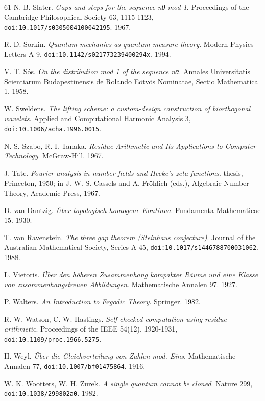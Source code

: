 \begin{thebibliography}{61}
N. B. Slater. \emph{Gaps and steps for the sequence nθ mod 1}. Proceedings of the Cambridge Philosophical Society 63, 1115-1123, \texttt{doi:10.1017/\allowbreak{}s0305004100042195}. 1967.

R. D. Sorkin. \emph{Quantum mechanics as quantum measure theory}. Modern Physics Letters A 9, \texttt{doi:10.1142/\allowbreak{}s021773239400294x}. 1994.

V. T. Sós. \emph{On the distribution mod 1 of the sequence nα}. Annales Universitatis Scientiarum Budapestinensis de Rolando Eötvös Nominatae, Sectio Mathematica 1. 1958.

W. Sweldens. \emph{The lifting scheme: a custom-design construction of biorthogonal wavelets}. Applied and Computational Harmonic Analysis 3, \texttt{doi:10.1006/\allowbreak{}acha.1996.0015}.

N. S. Szabo, R. I. Tanaka. \emph{Residue Arithmetic and Its Applications to Computer Technology}. McGraw-Hill. 1967.

J. Tate. \emph{Fourier analysis in number fields and Hecke's zeta-functions}. thesis, Princeton, 1950; in J. W. S. Cassels and A. Fröhlich (eds.), Algebraic Number Theory, Academic Press, 1967.

D. van Dantzig. \emph{Über topologisch homogene Kontinua}. Fundamenta Mathematicae 15. 1930.

T. van Ravenstein. \emph{The three gap theorem (Steinhaus conjecture)}. Journal of the Australian Mathematical Society, Series A 45, \texttt{doi:10.1017/\allowbreak{}s1446788700031062}. 1988.

L. Vietoris. \emph{Über den höheren Zusammenhang kompakter Räume und eine Klasse von zusammenhangstreuen Abbildungen}. Mathematische Annalen 97. 1927.

P. Walters. \emph{An Introduction to Ergodic Theory}. Springer. 1982.

R. W. Watson, C. W. Hastings. \emph{Self-checked computation using residue arithmetic}. Proceedings of the IEEE 54(12), 1920-1931, \texttt{doi:10.1109/\allowbreak{}proc.1966.5275}.

H. Weyl. \emph{Über die Gleichverteilung von Zahlen mod. Eins}. Mathematische Annalen 77, \texttt{doi:10.1007/\allowbreak{}bf01475864}. 1916.

W. K. Wootters, W. H. Zurek. \emph{A single quantum cannot be cloned}. Nature 299, \texttt{doi:10.1038/\allowbreak{}299802a0}. 1982.

\end{thebibliography}
